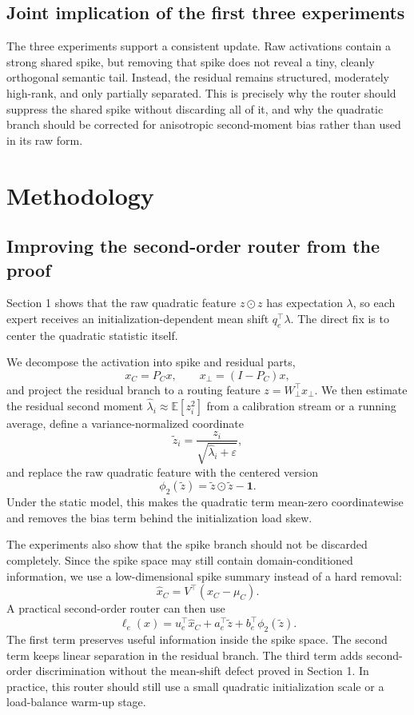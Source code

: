 \documentclass[11pt]{article}
\begin{document}
\subsection{Joint implication of the first three experiments}

The three experiments support a consistent update. Raw activations contain a strong shared spike, but removing that spike does not reveal a tiny, cleanly orthogonal semantic tail. Instead, the residual remains structured, moderately high-rank, and only partially separated. This is precisely why the router should suppress the shared spike without discarding all of it, and why the quadratic branch should be corrected for anisotropic second-moment bias rather than used in its raw form.

\section{Methodology}

\subsection{Improving the second-order router from the proof}

Section 1 shows that the raw quadratic feature $z \odot z$ has expectation $\lambda$, so each expert receives an initialization-dependent mean shift $q_e^\top \lambda$. The direct fix is to center the quadratic statistic itself.

We decompose the activation into spike and residual parts,
\[
x_C = P_C x, \qquad x_\perp = (I-P_C)x,
\]
and project the residual branch to a routing feature $z = W_\perp^\top x_\perp$. We then estimate the residual second moment $\hat{\lambda}_i \approx \mathbb{E}[z_i^2]$ from a calibration stream or a running average, define a variance-normalized coordinate
\[
\tilde z_i = \frac{z_i}{\sqrt{\hat{\lambda}_i + \varepsilon}},
\]
and replace the raw quadratic feature with the centered version
\[
\phi_2(\tilde z) = \tilde z \odot \tilde z - \mathbf{1}.
\]
Under the static model, this makes the quadratic term mean-zero coordinatewise and removes the bias term behind the initialization load skew.

The experiments also show that the spike branch should not be discarded completely. Since the spike space may still contain domain-conditioned information, we use a low-dimensional spike summary instead of a hard removal:
\[
\hat x_C = V^\top (x_C - \mu_C).
\]
A practical second-order router can then use
\[
\ell_e(x) = u_e^\top \hat x_C + a_e^\top \tilde z + b_e^\top \phi_2(\tilde z).
\]
The first term preserves useful information inside the spike space. The second term keeps linear separation in the residual branch. The third term adds second-order discrimination without the mean-shift defect proved in Section 1. In practice, this router should still use a small quadratic initialization scale or a load-balance warm-up stage.
\end{document}

